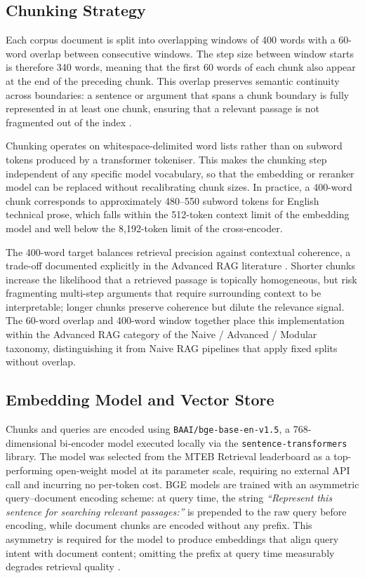 \subsection{Chunking Strategy}

Each corpus document is split into overlapping windows of 400 words with a 60-word overlap between consecutive windows. The step size between window starts is therefore 340 words, meaning that the first 60 words of each chunk also appear at the end of the preceding chunk. This overlap preserves semantic continuity across boundaries: a sentence or argument that spans a chunk boundary is fully represented in at least one chunk, ensuring that a relevant passage is not fragmented out of the index \cite{gao2023ragsurvey}.

Chunking operates on whitespace-delimited word lists rather than on subword tokens produced by a transformer tokeniser. This makes the chunking step independent of any specific model vocabulary, so that the embedding or reranker model can be replaced without recalibrating chunk sizes. In practice, a 400-word chunk corresponds to approximately 480–550 subword tokens for English technical prose, which falls within the 512-token context limit of the embedding model and well below the 8,192-token limit of the cross-encoder.

The 400-word target balances retrieval precision against contextual coherence, a trade-off documented explicitly in the Advanced RAG literature \cite{gao2023ragsurvey}. Shorter chunks increase the likelihood that a retrieved passage is topically homogeneous, but risk fragmenting multi-step arguments that require surrounding context to be interpretable; longer chunks preserve coherence but dilute the relevance signal. The 60-word overlap and 400-word window together place this implementation within the Advanced RAG category of the Naive / Advanced / Modular taxonomy, distinguishing it from Naive RAG pipelines that apply fixed splits without overlap.

\subsection{Embedding Model and Vector Store}

Chunks and queries are encoded using \texttt{BAAI/bge-base-en-v1.5}, a 768-dimensional bi-encoder model executed locally via the \texttt{sentence-transformers} library. The model was selected from the MTEB Retrieval leaderboard as a top-performing open-weight model at its parameter scale, requiring no external API call and incurring no per-token cost. BGE models are trained with an asymmetric query--document encoding scheme: at query time, the string \textit{``Represent this sentence for searching relevant passages:''} is prepended to the raw query before encoding, while document chunks are encoded without any prefix. This asymmetry is required for the model to produce embeddings that align query intent with document content; omitting the prefix at query time measurably degrades retrieval quality \cite{gao2023ragsurvey}.

